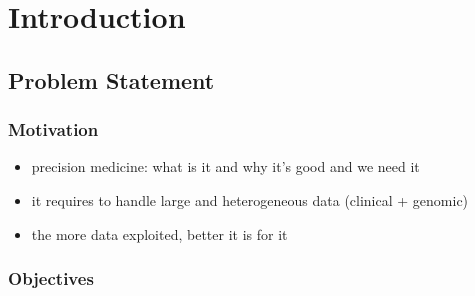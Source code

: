 \chapter{Introduction}

\section{Problem Statement}
\subsection*{Motivation}

\begin{itemize}
    \item precision medicine: what is it and why it's good and we need it
    \item it requires to handle large and heterogeneous data (clinical + genomic)
    \item the more data exploited, better it is for it
\end{itemize}



\subsection*{Objectives}



